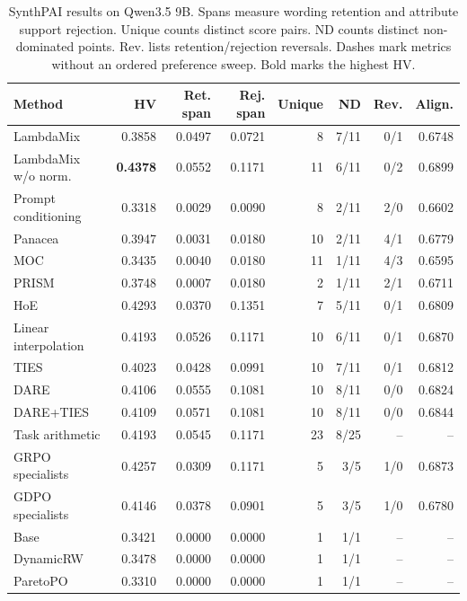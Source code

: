 \begin{table}[htbp]
\centering\small
\setlength{\tabcolsep}{3pt}
\caption{SynthPAI results on Qwen3.5 9B. Spans measure wording retention and attribute support rejection. Unique counts distinct score pairs. ND counts distinct non-dominated points. Rev. lists retention/rejection reversals. Dashes mark metrics without an ordered preference sweep. Bold marks the highest HV.}
\label{tab:full-synthpai-q9}
\begin{tabular}{@{}lrrrrrrr@{}}
\toprule
Method & HV & Ret. span & Rej. span & Unique & ND & Rev. & Align.\\
\midrule
LambdaMix & 0.3858 & 0.0497 & 0.0721 & 8 & 7/11 & 0/1 & 0.6748\\
LambdaMix w/o norm. & \textbf{0.4378} & 0.0552 & 0.1171 & 11 & 6/11 & 0/2 & 0.6899\\
\midrule
Prompt conditioning & 0.3318 & 0.0029 & 0.0090 & 8 & 2/11 & 2/0 & 0.6602\\
Panacea & 0.3947 & 0.0031 & 0.0180 & 10 & 2/11 & 4/1 & 0.6779\\
MOC & 0.3435 & 0.0040 & 0.0180 & 11 & 1/11 & 4/3 & 0.6595\\
PRISM & 0.3748 & 0.0007 & 0.0180 & 2 & 1/11 & 2/1 & 0.6711\\
HoE & 0.4293 & 0.0370 & 0.1351 & 7 & 5/11 & 0/1 & 0.6809\\
\midrule
Linear interpolation & 0.4193 & 0.0526 & 0.1171 & 10 & 6/11 & 0/1 & 0.6870\\
TIES & 0.4023 & 0.0428 & 0.0991 & 10 & 7/11 & 0/1 & 0.6812\\
DARE & 0.4106 & 0.0555 & 0.1081 & 10 & 8/11 & 0/0 & 0.6824\\
DARE+TIES & 0.4109 & 0.0571 & 0.1081 & 10 & 8/11 & 0/0 & 0.6844\\
Task arithmetic & 0.4193 & 0.0545 & 0.1171 & 23 & 8/25 & -- & --\\
\midrule
GRPO specialists & 0.4257 & 0.0309 & 0.1171 & 5 & 3/5 & 1/0 & 0.6873\\
GDPO specialists & 0.4146 & 0.0378 & 0.0901 & 5 & 3/5 & 1/0 & 0.6780\\
\midrule
Base & 0.3421 & 0.0000 & 0.0000 & 1 & 1/1 & -- & --\\
DynamicRW & 0.3478 & 0.0000 & 0.0000 & 1 & 1/1 & -- & --\\
ParetoPO & 0.3310 & 0.0000 & 0.0000 & 1 & 1/1 & -- & --\\
\bottomrule
\end{tabular}
\end{table}

